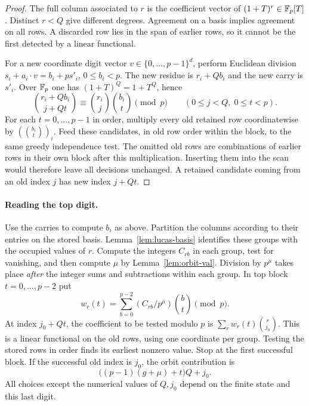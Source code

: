 \begin{proof}
The full column associated to $r$ is the coefficient vector of
$(1+T)^r\in\mathbb F_p[T]$. Distinct $r<Q$ give different degrees. Agreement
on a basis implies agreement on all rows. A discarded row lies
in the span of earlier rows, so it cannot be the first detected by a
linear functional.

For a new coordinate digit vector $v\in\{0,\ldots,p-1\}^d$, perform
Euclidean division $s_i+a_i\cdot v=b_i+p s'_i$, $0\le b_i<p$.
The new residue is $r_i+Qb_i$ and the new carry is $s'_i$.
Over $\mathbb F_p$ one has $(1+T)^Q=1+T^Q$, hence
\[
 \binom{r_i+Qb_i}{j+Qt}
 \equiv \binom{r_i}{j}\binom{b_i}{t}\pmod p
 \qquad(0\le j<Q,\;0\le t<p).
\]
For each $t=0,\ldots,p-1$ in order, multiply every old retained row
coordinatewise by $(\binom{b_i}{t})_i$. Feed these candidates, in old
row order within the block, to the same greedy independence test.
The omitted old rows are combinations of earlier rows in their own
block after this multiplication. Inserting them into the scan would
therefore leave all decisions unchanged. A retained candidate coming
from an old index $j$ has new index $j+Qt$.
\end{proof}

\paragraph{Reading the top digit.}
Use the carries to compute $b_i$ as above. Partition the columns
according to their entries on the stored basis.
Lemma~\ref{lem:lucas-basis} identifies these groups with the occupied
values of $r$. Compute the integers $C_{rb}$ in each group, test for
vanishing, and then compute $\mu$ by Lemma~\ref{lem:orbit-val}.
Division by $p^\mu$ takes place \emph{after} the integer sums and
subtractions within each group. In top block $t=0,\ldots,p-2$ put
\[
 w_r(t)=\sum_{b=0}^{p-2}(C_{rb}/p^\mu)\binom bt\pmod p .
\]
At index $j_0+Qt$, the coefficient to be tested modulo $p$ is
$\sum_r w_r(t)\binom{r}{j_0}$. This is a linear functional on
the old rows, using one coordinate per group. Testing the stored rows
in order finds its earliest nonzero value. Stop at the first successful
block. If the successful old index is $j_0$, the orbit contribution is
\[
 \big((p-1)(g+\mu)+t\big)Q+j_0 .
\]
All choices except the numerical values of $Q,j_0$ depend on the finite
state and this last digit.

